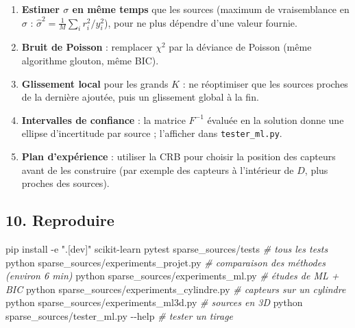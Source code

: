\documentclass[
  french,
]{article}
\newenvironment{Shaded}{}{}
\newcommand{\AttributeTok}[1]{\textcolor[rgb]{0.49,0.56,0.16}{#1}}
\newcommand{\CommentTok}[1]{\textcolor[rgb]{0.38,0.63,0.69}{\textit{#1}}}
\newcommand{\ExtensionTok}[1]{#1}
\newcommand{\NormalTok}[1]{#1}
\newcommand{\StringTok}[1]{\textcolor[rgb]{0.25,0.44,0.63}{#1}}
\providecommand{\tightlist}{%
  \setlength{\itemsep}{0pt}\setlength{\parskip}{0pt}}
\begin{document}
\begin{enumerate}
\def\labelenumi{\arabic{enumi}.}
\tightlist
\item
  \textbf{Estimer \(\sigma\) en même temps} que les sources (maximum de
  vraisemblance en \(\sigma\) :
  \(\hat\sigma^2 = \frac{1}{M}\sum_i r_i^2/y_i^2\)), pour ne plus
  dépendre d'une valeur fournie.
\item
  \textbf{Bruit de Poisson} : remplacer \(\chi^2\) par la déviance de
  Poisson (même algorithme glouton, même BIC).
\item
  \textbf{Glissement local} pour les grands \(K\) : ne réoptimiser que
  les sources proches de la dernière ajoutée, puis un glissement global
  à la fin.
\item
  \textbf{Intervalles de confiance} : la matrice \(F^{-1}\) évaluée en
  la solution donne une ellipse d'incertitude par source ; l'afficher
  dans \texttt{tester\_ml.py}.
\item
  \textbf{Plan d'expérience} : utiliser la CRB pour choisir la position
  des capteurs avant de les construire (par exemple des capteurs à
  l'intérieur de \(D\), plus proches des sources).
\end{enumerate}

\subsection{10. Reproduire}\label{reproduire}

\begin{Shaded}
\begin{Highlighting}[]
\ExtensionTok{pip}\NormalTok{ install }\AttributeTok{{-}e} \StringTok{".[dev]"}\NormalTok{ scikit{-}learn}
\ExtensionTok{pytest}\NormalTok{ sparse\_sources/tests                      }\CommentTok{\# tous les tests}
\ExtensionTok{python}\NormalTok{ sparse\_sources/experiments\_projet.py      }\CommentTok{\# comparaison des méthodes (environ 6 min)}
\ExtensionTok{python}\NormalTok{ sparse\_sources/experiments\_ml.py          }\CommentTok{\# études de ML + BIC}
\ExtensionTok{python}\NormalTok{ sparse\_sources/experiments\_cylindre.py    }\CommentTok{\# capteurs sur un cylindre}
\ExtensionTok{python}\NormalTok{ sparse\_sources/experiments\_ml3d.py        }\CommentTok{\# sources en 3D}
\ExtensionTok{python}\NormalTok{ sparse\_sources/tester\_ml.py }\AttributeTok{{-}{-}help}        \CommentTok{\# tester un tirage}
\end{Highlighting}
\end{Shaded}
\end{document}
